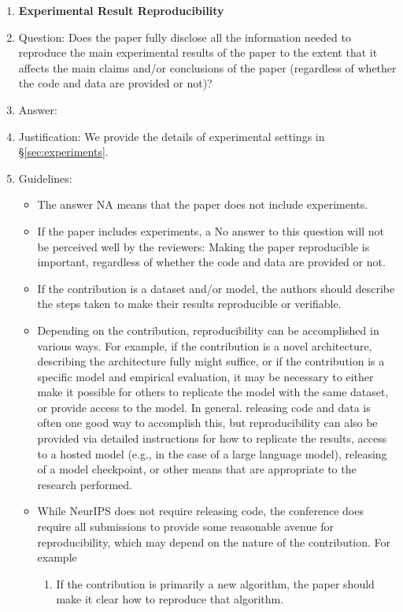 \documentclass[11pt]{article}
\theoremstyle{plain}
\theoremstyle{definition}
\theoremstyle{remark}
\renewcommand{\^}[1]{^{(#1)}}
\begin{document}
\begin{enumerate}
    \item {\bf Experimental Result Reproducibility}
    \item[] Question: Does the paper fully disclose all the information needed to reproduce the main experimental results of the paper to the extent that it affects the main claims and/or conclusions of the paper (regardless of whether the code and data are provided or not)?
    \item[] Answer: \answerYes{} 
    \item[] Justification:  We provide the details of experimental settings in \S \ref{sec:experiments}.
    \item[] Guidelines:
    \begin{itemize}
        \item The answer NA means that the paper does not include experiments.
        \item If the paper includes experiments, a No answer to this question will not be perceived well by the reviewers: Making the paper reproducible is important, regardless of whether the code and data are provided or not.
        \item If the contribution is a dataset and/or model, the authors should describe the steps taken to make their results reproducible or verifiable. 
        \item Depending on the contribution, reproducibility can be accomplished in various ways. For example, if the contribution is a novel architecture, describing the architecture fully might suffice, or if the contribution is a specific model and empirical evaluation, it may be necessary to either make it possible for others to replicate the model with the same dataset, or provide access to the model. In general. releasing code and data is often one good way to accomplish this, but reproducibility can also be provided via detailed instructions for how to replicate the results, access to a hosted model (e.g., in the case of a large language model), releasing of a model checkpoint, or other means that are appropriate to the research performed.
         \item While NeurIPS does not require releasing code, the conference does require all submissions to provide some reasonable avenue for reproducibility, which may depend on the nature of the contribution. For example
        \begin{enumerate}
            \item If the contribution is primarily a new algorithm, the paper should make it clear how to reproduce that algorithm.

\end{enumerate}
\end{itemize}
\end{enumerate}
\end{document}
